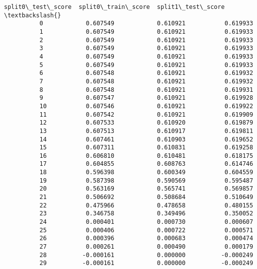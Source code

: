 \documentclass[11pt]{article}
\begin{document}
\begin{Verbatim}[commandchars=\\\{\}]
              split0\_test\_score  split0\_train\_score  split1\_test\_score  \textbackslash{}
          0            0.607549            0.610921           0.619933   
          1            0.607549            0.610921           0.619933   
          2            0.607549            0.610921           0.619933   
          3            0.607549            0.610921           0.619933   
          4            0.607549            0.610921           0.619933   
          5            0.607549            0.610921           0.619933   
          6            0.607548            0.610921           0.619932   
          7            0.607548            0.610921           0.619932   
          8            0.607548            0.610921           0.619931   
          9            0.607547            0.610921           0.619928   
          10           0.607546            0.610921           0.619922   
          11           0.607542            0.610921           0.619909   
          12           0.607533            0.610920           0.619879   
          13           0.607513            0.610917           0.619811   
          14           0.607461            0.610903           0.619652   
          15           0.607311            0.610831           0.619258   
          16           0.606810            0.610481           0.618175   
          17           0.604855            0.608763           0.614746   
          18           0.596398            0.600349           0.604559   
          19           0.587398            0.590569           0.595487   
          20           0.563169            0.565741           0.569857   
          21           0.506692            0.508684           0.510649   
          22           0.475966            0.478658           0.480155   
          23           0.346758            0.349496           0.350052   
          24           0.000401            0.000730           0.000607   
          25           0.000406            0.000722           0.000571   
          26           0.000396            0.000683           0.000474   
          27           0.000261            0.000490           0.000179   
          28          -0.000161            0.000000          -0.000249   
          29          -0.000161            0.000000          -0.000249   
          

\end{Verbatim}
\end{document}
